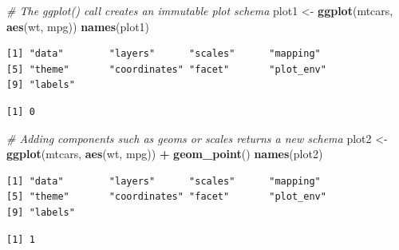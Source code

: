 \documentclass[
  openany]{book}
\newenvironment{Shaded}{\begin{snugshade}}{\end{snugshade}}
\newcommand{\CommentTok}[1]{\textcolor[rgb]{0.56,0.35,0.01}{\textit{#1}}}
\newcommand{\FunctionTok}[1]{\textcolor[rgb]{0.13,0.29,0.53}{\textbf{#1}}}
\newcommand{\NormalTok}[1]{#1}
\newcommand{\OtherTok}[1]{\textcolor[rgb]{0.56,0.35,0.01}{#1}}
\newcommand{\SpecialCharTok}[1]{\textcolor[rgb]{0.81,0.36,0.00}{\textbf{#1}}}
\theoremstyle{definition}
\theoremstyle{definition}
\theoremstyle{definition}
\theoremstyle{definition}
\theoremstyle{remark}
\begin{document}
\begin{Shaded}
\begin{Highlighting}[]
\CommentTok{\# The ggplot() call creates an immutable plot schema}
\NormalTok{plot1 }\OtherTok{\textless{}{-}} \FunctionTok{ggplot}\NormalTok{(mtcars, }\FunctionTok{aes}\NormalTok{(wt, mpg))}
\FunctionTok{names}\NormalTok{(plot1)}
\end{Highlighting}
\end{Shaded}

\begin{verbatim}
[1] "data"        "layers"      "scales"      "mapping"    
[5] "theme"       "coordinates" "facet"       "plot_env"   
[9] "labels"     
\end{verbatim}

\begin{Shaded}
\end{Shaded}

\begin{verbatim}
[1] 0
\end{verbatim}

\begin{Shaded}
\begin{Highlighting}[]
\CommentTok{\# Adding components such as geoms or scales returns a new schema}
\NormalTok{plot2 }\OtherTok{\textless{}{-}} \FunctionTok{ggplot}\NormalTok{(mtcars, }\FunctionTok{aes}\NormalTok{(wt, mpg)) }\SpecialCharTok{+} \FunctionTok{geom\_point}\NormalTok{()}
\FunctionTok{names}\NormalTok{(plot2)}
\end{Highlighting}
\end{Shaded}

\begin{verbatim}
[1] "data"        "layers"      "scales"      "mapping"    
[5] "theme"       "coordinates" "facet"       "plot_env"   
[9] "labels"     
\end{verbatim}

\begin{Shaded}
\end{Shaded}

\begin{verbatim}
[1] 1
\end{verbatim}
\end{document}
